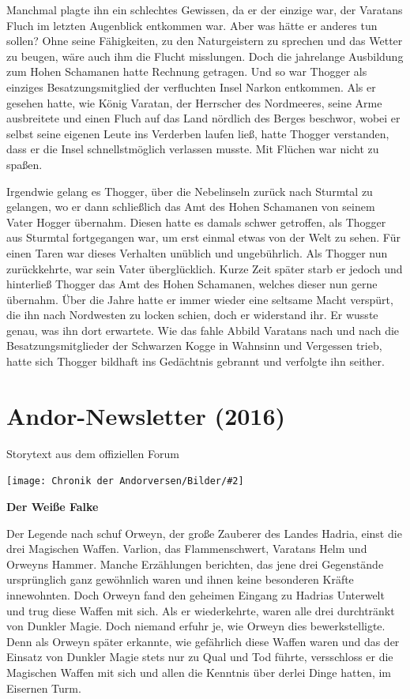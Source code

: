 \documentclass[10pt, a4paper, oneside]{book}
\newcommand{\fillbreak}{\vspace*{\fill}\columnbreak}
\newcommand{\storytext}[1]{%
    \section{#1}%
    \label{Storytext: #1}%
}
\newcommand{\bildmitts}[2][height=0.32\textwidth,width=0.48\textwidth,keepaspectratio]{%
    \begin{center}
        \texttt{[image: Chronik der Andorversen/Bilder/\#2]}
    \end{center}
}
\begin{document}
\begin{multicols}{2}
Manchmal plagte ihn ein schlechtes Gewissen, da er der einzige war, der Varatans Fluch im letzten Augenblick entkommen war. Aber was hätte er anderes tun sollen? Ohne seine Fähigkeiten, zu den Naturgeistern zu sprechen und das Wetter zu beugen, wäre auch ihm die Flucht misslungen. Doch die jahrelange Ausbildung zum Hohen Schamanen hatte Rechnung getragen. Und so war Thogger als einziges Besatzungsmitglied der verfluchten Insel Narkon entkommen. Als er gesehen hatte, wie König Varatan, der Herrscher des Nordmeeres, seine Arme ausbreitete und einen Fluch auf das Land nördlich des Berges beschwor, wobei er selbst seine eigenen Leute ins Verderben laufen ließ, hatte Thogger verstanden, dass er die Insel schnellstmöglich verlassen musste. Mit Flüchen war nicht zu spaßen.\bigskip

Irgendwie gelang es Thogger, über die Nebelinseln zurück nach Sturmtal zu gelangen, wo er dann schließlich das Amt des Hohen Schamanen von seinem Vater Hogger übernahm. Diesen hatte es damals schwer getroffen, als Thogger aus Sturmtal fortgegangen war, um erst einmal etwas von der Welt zu sehen. Für einen Taren war dieses Verhalten unüblich und ungebührlich. Als Thogger nun zurückkehrte, war sein Vater überglücklich. Kurze Zeit später starb er jedoch und hinterließ Thogger das Amt des Hohen Schamanen, welches dieser nun gerne übernahm. Über die Jahre hatte er immer wieder eine seltsame Macht verspürt, die ihn nach Nordwesten zu locken schien, doch er widerstand ihr. Er wusste genau, was ihn dort erwartete. Wie das fahle Abbild Varatans nach und nach die Besatzungsmitglieder der Schwarzen Kogge in Wahnsinn und Vergessen trieb, hatte sich Thogger bildhaft ins Gedächtnis gebrannt und verfolgte ihn seither.


\fillbreak
\storytext{Andor-Newsletter (2016)}

\begin{center}
    Storytext aus dem offiziellen Forum
\end{center}

\bildmitts{Der Andor Newsletter (2016).jpeg}

\textbf{Der Weiße Falke}\bigskip

Der Legende nach schuf Orweyn, der große Zauberer des Landes Hadria, einst die drei Magischen Waffen. Varlion, das Flammenschwert, Varatans Helm und Orweyns Hammer. Manche Erzählungen berichten, das jene drei Gegenstände ursprünglich ganz gewöhnlich waren und ihnen keine besonderen Kräfte innewohnten. Doch Orweyn fand den geheimen Eingang zu Hadrias Unterwelt und trug diese Waffen mit sich. Als er wiederkehrte, waren alle drei durchtränkt von Dunkler Magie. Doch niemand erfuhr je, wie Orweyn dies bewerkstelligte. Denn als Orweyn später erkannte, wie gefährlich diese Waffen waren und das der Einsatz von Dunkler Magie stets nur zu Qual und Tod führte, versschloss er die Magischen Waffen mit sich und allen die Kenntnis über derlei Dinge hatten, im Eisernen Turm.


\end{multicols}
\end{document}
